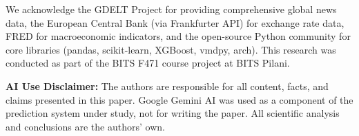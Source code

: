 \documentclass[11pt]{article}
\begin{document}
We acknowledge the GDELT Project for providing comprehensive global news data, the European Central Bank (via Frankfurter API) for exchange rate data, FRED for macroeconomic indicators, and the open-source Python community for core libraries (pandas, scikit-learn, XGBoost, vmdpy, arch). This research was conducted as part of the BITS F471 course project at BITS Pilani.

\textbf{AI Use Disclaimer:} The authors are responsible for all content, facts, and claims presented in this paper. Google Gemini AI was used as a component of the prediction system under study, not for writing the paper. All scientific analysis and conclusions are the authors' own.

\end{document}
